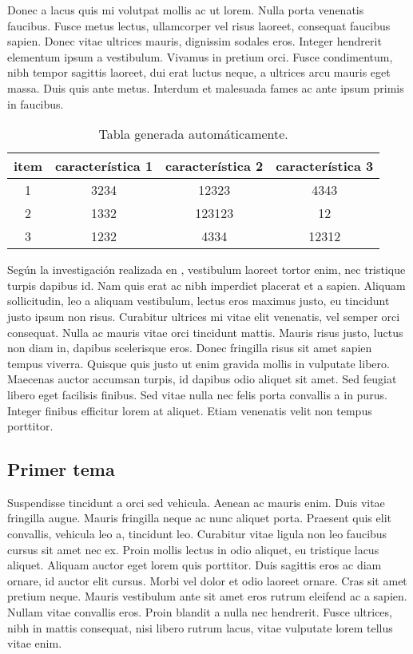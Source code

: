 Donec a lacus quis mi volutpat mollis ac ut lorem. Nulla porta venenatis faucibus. Fusce metus lectus, ullamcorper vel risus laoreet, consequat faucibus sapien. Donec vitae ultrices mauris, dignissim sodales eros. Integer hendrerit elementum ipsum a vestibulum. Vivamus in pretium orci. Fusce condimentum, nibh tempor sagittis laoreet, dui erat luctus neque, a ultrices arcu mauris eget massa. Duis quis ante metus. Interdum et malesuada fames ac ante ipsum primis in faucibus.

\begin{table}[b]
\centering
\begin{tabular}{|c|c|c|c|}
\hline
\textbf{item} & \textbf{característica 1} & \textbf{característica 2} & \textbf{característica 3} \\ \hline
1             & 3234                      & 12323                     & 4343                      \\ \hline
2             & 1332                      & 123123                    & 12                        \\ \hline
3             & 1232                      & 4334                      & 12312                     \\ \hline
\end{tabular}
\caption{Tabla generada automáticamente.}
    \label{cuadro:prueba2}
\end{table}

Según la investigación realizada en \cite{lee2001biomedical}, vestibulum laoreet tortor enim, nec tristique turpis dapibus id. Nam quis erat ac nibh imperdiet placerat et a sapien. Aliquam sollicitudin, leo a aliquam vestibulum, lectus eros maximus justo, eu tincidunt justo ipsum non risus. Curabitur ultrices mi vitae elit venenatis, vel semper orci consequat. Nulla ac mauris vitae orci tincidunt mattis. Mauris risus justo, luctus non diam in, dapibus scelerisque eros. Donec fringilla risus sit amet sapien tempus viverra. Quisque quis justo ut enim gravida mollis in vulputate libero. Maecenas auctor accumsan turpis, id dapibus odio aliquet sit amet. Sed feugiat libero eget facilisis finibus. Sed vitae nulla nec felis porta convallis a in purus. Integer finibus efficitur lorem at aliquet. Etiam venenatis velit non tempus porttitor.

\subsection*{Primer tema}

Suspendisse tincidunt a orci sed vehicula. Aenean ac mauris enim. Duis vitae fringilla augue. Mauris fringilla neque ac nunc aliquet porta. Praesent quis elit convallis, vehicula leo a, tincidunt leo. Curabitur vitae ligula non leo faucibus cursus sit amet nec ex. Proin mollis lectus in odio aliquet, eu tristique lacus aliquet. Aliquam auctor eget lorem quis porttitor. Duis sagittis eros ac diam ornare, id auctor elit cursus. Morbi vel dolor et odio laoreet ornare. Cras sit amet pretium neque. Mauris vestibulum ante sit amet eros rutrum eleifend ac a sapien. Nullam vitae convallis eros. Proin blandit a nulla nec hendrerit. Fusce ultrices, nibh in mattis consequat, nisi libero rutrum lacus, vitae vulputate lorem tellus vitae enim.

